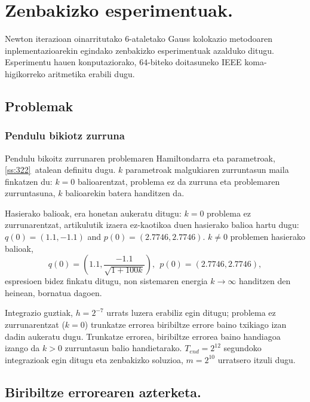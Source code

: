 \clearpage

\section{Zenbakizko esperimentuak.}
\label{sec:7.7}

\label{s:ne}

Newton iterazioan oinarritutako $6$-ataletako Gauss kolokazio metodoaren inplementazioarekin egindako zenbakizko esperimentuak azalduko ditugu. Esperimentu hauen konputaziorako, $64$-biteko doitasuneko IEEE koma-higikorreko aritmetika erabili dugu.

\subsection{Problemak}

\subsubsection*{Pendulu bikiotz zurruna}

Pendulu bikoitz zurrunaren problemaren Hamiltondarra eta parametroak, \ref{ss:322}~atalean definitu dugu. $k$ parametroak malgukiaren zurruntasun maila finkatzen du: $k=0$ balioarentzat, problema ez da zurruna eta problemaren zurruntasuna, $k$ balioarekin batera handitzen da. 

Hasierako balioak, era honetan aukeratu ditugu: $k=0$ problema ez zurrunarentzat, \cite{Dumitru} artikulutik izaera ez-kaotikoa duen hasierako balioa hartu dugu: $q(0)=(1.1, -1.1)$ and $p(0)=(2.7746,2.7746)$. $k\neq 0$ problemen hasierako balioak,
\begin{equation*}
q(0)=\left(1.1, \frac{-1.1}{\sqrt{1+100k}}\right), \ \ 
p(0)=(2.7746,2.7746),
\end{equation*}
espresioen bidez finkatu  ditugu, non sistemaren energia $k \rightarrow \infty$ handitzen den heinean, bornatua dagoen.

Integrazio guztiak, $h=2^{-7}$ urrats luzera erabiliz egin ditugu; problema ez zurrunarentzat ($k=0$) trunkatze errorea biribiltze errore baino txikiago izan dadin aukeratu dugu. Trunkatze errorea, biribiltze errorea baino handiagoa izango da $k>0$ zurruntasun balio handietarako. $T_{end}=2^{12}$ segundoko integrazioak egin ditugu eta zenbakizko soluzioa, $m=2^{10}$ urratsero itzuli dugu. 

\subsection{Biribiltze errorearen azterketa.}

